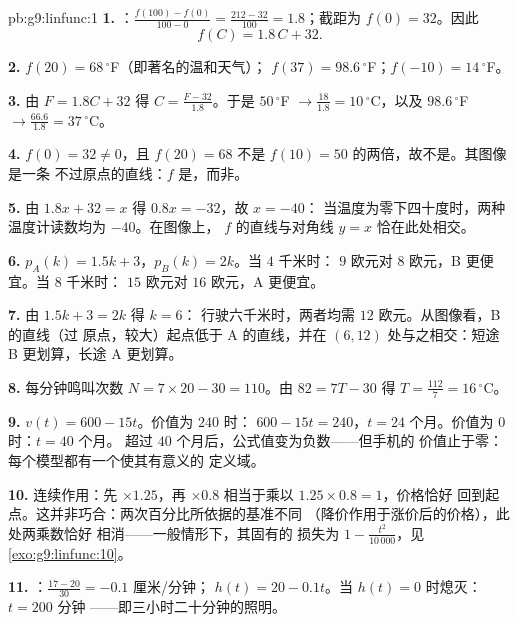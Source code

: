 \begin{solution}{pb:g9:linfunc:1}
\textbf{1.} ：$\frac{f(100) - f(0)}{100 - 0} =
\frac{212 - 32}{100} = 1.8$；截距为 $f(0) = 32$。因此
\[
f(C) = 1.8\,C + 32 .
\]

\textbf{2.} $f(20) = 68\,^\circ$F（即著名的温和天气）；
$f(37) = 98.6\,^\circ$F；$f(-10) = 14\,^\circ$F。

\textbf{3.} 由 $F = 1.8C + 32$ 得
$C = \frac{F - 32}{1.8}$。于是 $50\,^\circ$F
$\to \frac{18}{1.8} = 10\,^\circ$C，以及 $98.6\,^\circ$F
$\to \frac{66.6}{1.8} = 37\,^\circ$C。

\textbf{4.} $f(0) = 32 \neq 0$，且 $f(20) = 68$ 不是
$f(10) = 50$ 的两倍，故不是。其图像是一条
不过原点的直线：$f$ 是\emph{}，而非。

\textbf{5.} 由 $1.8x + 32 = x$ 得 $0.8x = -32$，故 $x = -40$：
当温度为零下四十度时，两种温度计读数均为 $-40$。在图像上，
$f$ 的直线与对角线 $y = x$ 恰在此处相交。

\textbf{6.} $p_A(k) = 1.5k + 3$，$p_B(k) = 2k$。当 $4$ 千米时：
$9$ 欧元对 $8$ 欧元，B 更便宜。当 $8$ 千米时：
$15$ 欧元对 $16$ 欧元，A 更便宜。

\textbf{7.} 由 $1.5k + 3 = 2k$ 得 $k = 6$：
行驶六千米时，两者均需 $12$ 欧元。从图像看，B 的直线（过
原点，较大）起点低于 A 的直线，并在
$(6, 12)$ 处与之相交：短途 B 更划算，长途 A 更划算。

\textbf{8.} 每分钟鸣叫次数 $N = 7 \times 20 - 30 = 110$。由
$82 = 7T - 30$ 得 $T = \frac{112}{7} = 16\,^\circ$C。

\textbf{9.} $v(t) = 600 - 15t$。价值为 $240$ 时：
$600 - 15t = 240$，$t = 24$ 个月。价值为 $0$ 时：$t = 40$ 个月。
超过 $40$ 个月后，公式值变为负数——但手机的
价值止于零：每个模型都有一个使其有意义的
定义域。

\textbf{10.} 连续作用：先 $\times 1.25$，再 $\times 0.8$
相当于乘以 $1.25 \times 0.8 = 1$，价格恰好
回到起点。这并非巧合：两次百分比所依据的基准不同
（降价作用于涨价后的价格），此处两乘数恰好
相消——一般情形下，其固有的
损失为 $1 - \frac{t^2}{10\,000}$，见
\cref{exo:g9:linfunc:10}。

\textbf{11.} ：$\frac{17 - 20}{30} = -0.1$ 厘米/分钟；
$h(t) = 20 - 0.1t$。当 $h(t) = 0$ 时熄灭：$t = 200$ 分钟
——即三小时二十分钟的照明。


\end{solution}
